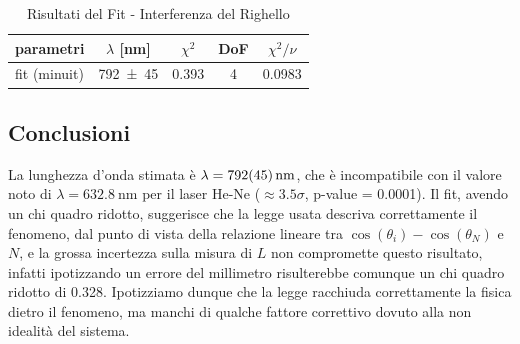 \documentclass[a4paper]{article}
\begin{document}
\begin{table}[htbp]
\caption{Risultati del Fit - Interferenza del Righello}
\label{tab:interferenza-righello-risultati}
\centering
\begin{tabular}{|l|cccc|}
\hline
parametri & $\lambda$ [\si{\nano\meter}] & $\chi^2$ & DoF & $\chi^2/\nu$ \\\hline\hline
fit (minuit) & \num{792 \pm 45} & \num{0.393} & 4 & \num{0.0983} \\\hline
\end{tabular}
\end{table}

\subsection{Conclusioni}
La lunghezza d'onda stimata è $\lambda = \SI{792 \pm 45}{\nano\meter}$, che è incompatibile con il valore noto di $\lambda = \SI{632.8}{\nano\meter}$ per il laser He-Ne ($\approx \num{3.5} \sigma$, p-value = \num{0.0001}). Il fit, avendo un chi quadro ridotto, suggerisce che la legge usata descriva correttamente il fenomeno, dal punto di vista della relazione lineare tra $\cos(\theta_i) - \cos(\theta_N)$ e $N$, e la grossa incertezza sulla misura di $L$ non compromette questo risultato, infatti ipotizzando un errore del millimetro risulterebbe comunque un chi quadro ridotto di \num{0.328}. Ipotizziamo dunque che la legge racchiuda correttamente la fisica dietro il fenomeno, ma manchi di qualche fattore correttivo dovuto alla non idealità del sistema. 
\end{document}
